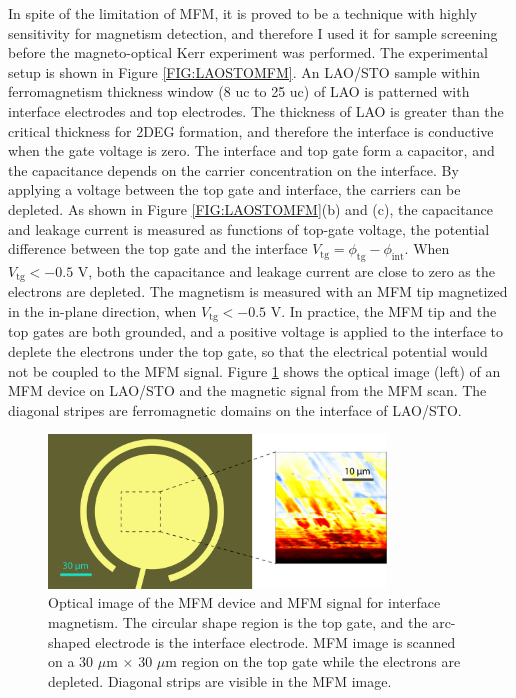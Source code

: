 \documentclass[pdflatex, sectionletters, 12pt]{pittetd}    %
\begin{document}
In spite of the limitation of MFM, it is proved to be a technique with highly sensitivity\cite{bi2014room} for magnetism detection, and therefore I used it for sample screening before the magneto-optical Kerr experiment was performed. The experimental setup is shown in Figure \ref{FIG:LAOSTOMFM}. An LAO/STO sample within ferromagnetism thickness window (8 uc to 25 uc) of LAO\cite{bi2015laalo3} is patterned with interface electrodes and top electrodes. The thickness of LAO is greater than the critical thickness for 2DEG formation, and therefore the interface is conductive when the gate voltage is zero. The interface and top gate form a capacitor, and the capacitance depends on the carrier concentration on the interface. By applying a voltage between the top gate and interface, the carriers can be depleted. As shown in Figure \ref{FIG:LAOSTOMFM}(b) and (c), the capacitance and leakage current is measured as functions of top-gate voltage, the potential difference between the top gate and the interface $V_\mathrm{tg} = \phi_\mathrm{tg} - \phi_\mathrm{int}$. When $V_\mathrm{tg} < -0.5$ V, both the capacitance and leakage current are close to zero as the electrons are depleted. The magnetism is measured with an MFM tip magnetized in the in-plane direction, when $V_\mathrm{tg} < -0.5$ V. In practice, the MFM tip and the top gates are both grounded, and a positive voltage is applied to the interface to deplete the electrons under the top gate, so that the electrical potential would not be coupled to the MFM signal. Figure \ref{FIG:MFMSignal} shows the optical image (left) of an MFM device on LAO/STO and the magnetic signal from the MFM scan. The diagonal stripes are ferromagnetic domains on the interface of LAO/STO.
\\

\begin{figure}[h!]
	\centering
	\includegraphics[width=0.8\textwidth]{Drawing/MFMSignal.pdf}
	\caption{Optical image of the MFM device and MFM signal for interface magnetism. The circular shape region is the top gate, and the arc-shaped electrode is the interface electrode. MFM image is scanned on a 30 $\mu$m $
		\times$ 30 $\mu$m region on the top gate while the electrons are depleted. Diagonal strips are visible in the MFM image.}
	\label{FIG:MFMSignal}
\end{figure}
\end{document}

